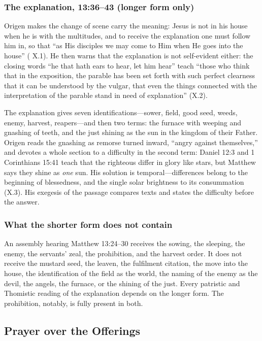\subsubsection*{The explanation, 13:36--43 (longer form only)}

Origen makes the change of scene carry the meaning: Jesus is not in his house
when he is with the multitudes, and to receive the explanation one must follow
him in, so that ``as His disciples we may come to Him when He goes into the
house'' ( X.1). He then warns that the explanation
is not self-evident either: the closing words ``he that hath ears to hear, let
him hear'' teach ``those who think that in the exposition, the parable has been
set forth with such perfect clearness that it can be understood by the vulgar,
that even the things connected with the interpretation of the parable stand in
need of explanation'' (X.2).

The explanation gives seven identifications---sower, field, good seed, weeds,
enemy, harvest, reapers---and then two terms: the furnace with weeping and
gnashing of teeth, and the just shining as the sun in the kingdom of their
Father. Origen reads the gnashing as remorse turned inward, ``angry against
themselves,'' and devotes a whole section to a difficulty in the second term:
Daniel 12:3 and 1 Corinthians 15:41 teach that the righteous differ in glory
like stars, but Matthew says they shine as \emph{one} sun. His solution is
temporal---differences belong to the beginning of blessedness, and the single
solar brightness to its consummation (X.3). His exegesis of the passage
compares texts and states the difficulty before the answer.

\subsubsection*{What the shorter form does not contain}

An assembly hearing Matthew 13:24--30 receives the sowing, the sleeping, the
enemy, the servants' zeal, the prohibition, and the harvest order. It does not
receive the mustard seed, the leaven, the fulfilment citation, the move into
the house, the identification of the field as the world, the naming of the
enemy as the devil, the angels, the furnace, or the shining of the just. Every
patristic and Thomistic reading of the explanation depends on the longer
form. The prohibition, notably, is fully
present in both.

\subsection*{Prayer over the Offerings}

